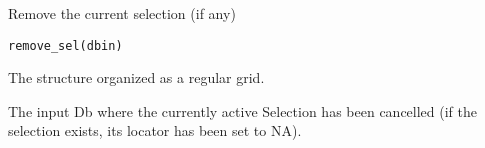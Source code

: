 %
\begin{Description}\relax
Remove the current selection (if any)
\end{Description}
%
\begin{Usage}
\begin{verbatim}
remove_sel(dbin)
\end{verbatim}
\end{Usage}
%
\begin{Arguments}
\begin{ldescription}
\item[\code{dbin}] 
The  structure organized as a regular grid.

\end{ldescription}
\end{Arguments}
%
\begin{Value}
The input Db where the currently active Selection has been cancelled (if the
selection exists, its locator has been set to NA).
\end{Value}
